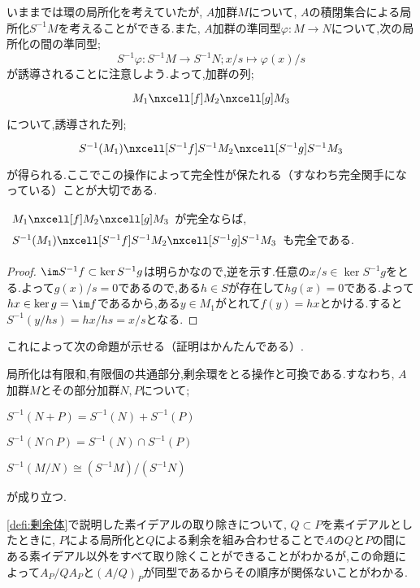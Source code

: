 いままでは環の局所化を考えていたが, $A$加群$M$について, $A$の積閉集合による局所化$S^{-1}M$を考えることができる.また, $A$加群の準同型$\varphi:M\to N$について,次の局所化の間の準同型;
\[S^{-1}\varphi:S^{-1}M\to S^{-1}N;x/s\mapsto \varphi(x)/s\]
が誘導されることに注意しよう.よって,加群の列;
\[\begin{tikzcd}
	M_1\nxcell[f]M_2\nxcell[g]M_3
\end{tikzcd}\]
について,誘導された列;
\[\begin{tikzcd}
S^{-1}(M_1)\nxcell[S^{-1}f]S^{-1}M_2\nxcell[S^{-1}g]S^{-1}M_3
\end{tikzcd}\]
が得られる.ここでこの操作によって完全性が保たれる（すなわち完全関手になっている）ことが大切である.

\begin{prop}\label{prop:局所化は完全関手}
	$\begin{tikzcd}
	M_1\nxcell[f]M_2\nxcell[g]M_3
	\end{tikzcd}$が完全ならば, $\begin{tikzcd}
	S^{-1}(M_1)\nxcell[S^{-1}f]S^{-1}M_2\nxcell[S^{-1}g]S^{-1}M_3
	\end{tikzcd}$も完全である.
\end{prop}
\begin{proof}
	$\im S^{-1}f\subset\ker S^{-1}g$は明らかなので,逆を示す.任意の$x/s\in\ker S^{-1}g$をとる.よって$g(x)/s=0$であるので,ある$h\in S$が存在して$hg(x)=0$である.よって$hx\in\ker g=\im f$であるから,ある$y\in M_1$がとれて$f(y)=hx$とかける.すると$S^{-1}(y/hs)=hx/hs=x/s$となる.
\end{proof}

これによって次の命題が示せる（証明はかんたんである）.
\begin{prop}\label{prop:局所化はいろんな操作と可換}
	局所化は有限和,有限個の共通部分,剰余環をとる操作と可換である.すなわち, $A$加群$M$とその部分加群$N,P$について;
	\begin{sakura}
		\item $S^{-1}(N+P)=S^{-1}(N)+S^{-1}(P)$
		\item $S^{-1}(N\cap P)=S^{-1}(N)\cap S^{-1}(P)$
		\item $S^{-1}(M/N)\cong (S^{-1}M)/(S^{-1}N)$
	\end{sakura}
	が成り立つ.
\end{prop}

\ref{defi:剰余体}で説明した素イデアルの取り除きについて, $Q\subset P$を素イデアルとしたときに, $P$による局所化と$Q$による剰余を組み合わせることで$A$の$Q$と$P$の間にある素イデアル以外をすべて取り除くことができることがわかるが,この命題によって$A_P/QA_P$と$(A/Q)_P$が同型であるからその順序が関係ないことがわかる.

